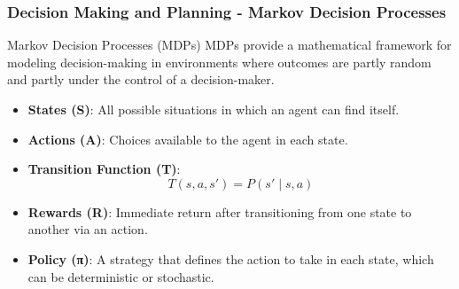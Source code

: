 \documentclass[aspectratio=169]{beamer}
\begin{document}
\begin{frame}[fragile]
    \frametitle{Decision Making and Planning - Markov Decision Processes}
    \begin{block}{Markov Decision Processes (MDPs)}
        MDPs provide a mathematical framework for modeling decision-making in environments where outcomes are partly random and partly under the control of a decision-maker.
    \end{block}
    
    \begin{itemize}
        \item \textbf{States (S)}: All possible situations in which an agent can find itself.
        \item \textbf{Actions (A)}: Choices available to the agent in each state.
        \item \textbf{Transition Function (T)}: 
            \begin{equation}
                T(s, a, s') = P(s' \mid s, a)
            \end{equation}
        \item \textbf{Rewards (R)}: Immediate return after transitioning from one state to another via an action.
        \item \textbf{Policy (π)}: A strategy that defines the action to take in each state, which can be deterministic or stochastic.
    \end{itemize}
\end{frame}
\end{document}
